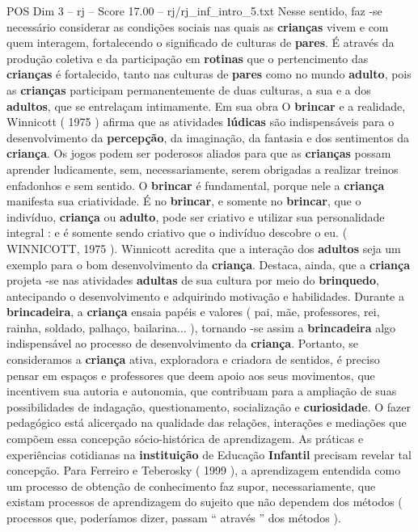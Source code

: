 \begin{textsample}{POS Dim 3 – rj – Score 17.00 – rj/rj\_inf\_intro\_5.txt}
Nesse sentido, faz -se necessário considerar as condições sociais nas quais as \textbf{crianças} vivem e com quem interagem, fortalecendo o significado de culturas de \textbf{pares}.
É através da produção coletiva e da participação em \textbf{rotinas} que o pertencimento das \textbf{crianças} é fortalecido, tanto nas culturas de \textbf{pares} como no mundo \textbf{adulto}, pois as \textbf{crianças} participam permanentemente de duas culturas, a sua e a dos \textbf{adultos}, que se entrelaçam intimamente.
Em sua obra O \textbf{brincar} e a realidade, Winnicott ( 1975 ) afirma que as atividades \textbf{lúdicas} são indispensáveis para o desenvolvimento da \textbf{percepção}, da imaginação, da fantasia e dos sentimentos da \textbf{criança}.
Os jogos podem ser poderosos aliados para que as \textbf{crianças} possam aprender ludicamente, sem, necessariamente, serem obrigadas a realizar treinos enfadonhos e sem sentido.
O \textbf{brincar} é fundamental, porque nele a \textbf{criança} manifesta sua criatividade.
É no \textbf{brincar}, e somente no \textbf{brincar}, que o indivíduo, \textbf{criança} ou \textbf{adulto}, pode ser criativo e utilizar sua personalidade integral : e é somente sendo criativo que o indivíduo descobre o eu. ( WINNICOTT, 1975 ).
Winnicott acredita que a interação dos \textbf{adultos} seja um exemplo para o bom desenvolvimento da \textbf{criança}.
Destaca, ainda, que a \textbf{criança} projeta -se nas atividades \textbf{adultas} de sua cultura por meio do \textbf{brinquedo}, antecipando o desenvolvimento e adquirindo motivação e habilidades.
Durante a \textbf{brincadeira}, a \textbf{criança} ensaia papéis e valores ( pai, mãe, professores, rei, rainha, soldado, palhaço, bailarina... ), tornando -se assim a \textbf{brincadeira} algo indispensável ao processo de desenvolvimento da \textbf{criança}.
Portanto, se consideramos a \textbf{criança} ativa, exploradora e criadora de sentidos, é preciso pensar em espaços e professores que deem apoio aos seus movimentos, que incentivem sua autoria e autonomia, que contribuam para a ampliação de suas possibilidades de indagação, questionamento, socialização e \textbf{curiosidade}.
O fazer pedagógico está alicerçado na qualidade das relações, interações e mediações que compõem essa concepção sócio-histórica de aprendizagem.
As práticas e experiências cotidianas na \textbf{instituição} de Educação \textbf{Infantil} precisam revelar tal concepção.
Para Ferreiro e Teberosky ( 1999 ), a aprendizagem entendida como um processo de obtenção de conhecimento faz supor, necessariamente, que existam processos de aprendizagem do sujeito que não dependem dos métodos ( processos que, poderíamos dizer, passam “ através ” dos métodos ).

\end{textsample}
